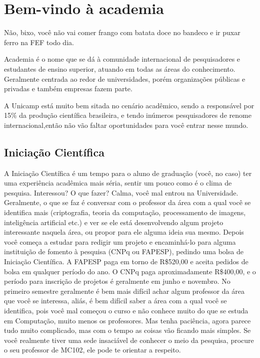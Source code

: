 
\section{Bem-vindo à academia}

Não, bixo, você não vai comer frango com batata doce no bandeco e ir puxar ferro
na FEF todo dia.  

Academia é o nome que se dá à comunidade internacional de pesquisadores e
estudantes de ensino superior, atuando em todas as áreas do
conhecimento. Geralmente centrada ao redor de universidades, porém organizações
públicas e privadas e também empresas fazem parte.

A Unicamp está muito bem sitada no cenário acadêmico, sendo a responsável por
15\% da produção científica brasileira, e tendo inúmeros pesquisadores de renome
internacional,então não vão faltar oportunidades para você entrar nesse mundo.

\subsection{Iniciação Científica}

A Iniciação Científica é um tempo para o aluno de graduação (você, no caso) ter
uma experiência acadêmica mais séria, sentir um pouco como é o clima de
pesquisa. Interessou? O que fazer? Calma, você mal entrou na Universidade.
Geralmente, o que se faz é conversar com o professor da área com a qual você se
identifica mais (criptografia, teoria da computação, processamento de imagens,
inteligência artificial etc.) e ver se ele está desenvolvendo algum projeto
interessante naquela área, ou propor para ele alguma ideia sua mesmo.  Depois
você começa a estudar para redigir um projeto e encaminhá-lo para alguma
instituição de fomento à pesquisa (CNPq ou FAPESP), pedindo uma bolsa de
Iniciação Científica. A FAPESP paga em torno de R\$520,00 e aceita pedidos de
bolsa em qualquer período do ano. O CNPq paga aproximadamente R\$400,00, e o
período para inscrição de projetos é geralmente em junho e novembro. No primeiro
semestre geralmente é bem mais difícil achar algum professor da área que você se
interessa, aliás, é bem difícil saber a área com a qual você se identifica, pois
você mal começou o curso e não conhece muito do que se estuda em Computação,
muito menos os professores. Mas tenha paciência, agora parece tudo muito
complicado, mas com o tempo as coisas vão ficando mais simples. Se você
realmente tiver uma sede insaciável de conhecer o meio da pesquisa, procure o
seu professor de MC102, ele pode te orientar a respeito.

